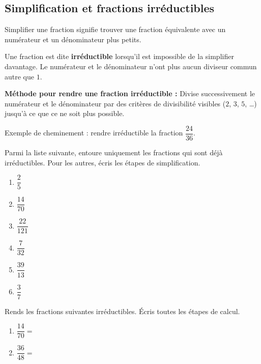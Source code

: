 \documentclass[../../syllabus_1.tex]{subfiles}
\begin{document}
\begin{itemize}
\subsection{Simplification et fractions irréductibles}
 
Simplifier une fraction signifie trouver une fraction équivalente avec un numérateur et un dénominateur plus petits.
 
Une fraction est dite \textbf{irréductible} lorsqu'il est impossible de la simplifier davantage. Le numérateur et le dénominateur n'ont plus aucun diviseur commun autre que $1$.
 
\textbf{Méthode pour rendre une fraction irréductible :}
    Divise successivement le numérateur et le dénominateur par des critères de divisibilité visibles ($2$, $3$, $5$, \dots) jusqu'à ce que ce ne soit plus possible.
 
Exemple de cheminement : rendre irréductible la fraction $\dfrac{24}{36}$.
\begin{center}
\end{center}
 
\newpage
\begin{exercise}
    Parmi la liste suivante, entoure uniquement les fractions qui sont déjà irréductibles. Pour les autres, écris les étapes de simplification.
    \begin{enumerate}[cols=3, itemsep=1.5cm, label=\ ]
        \item $\dfrac{2}{5}$
        \item $\dfrac{14}{70}$
        \item $\dfrac{22}{121}$
        \item $\dfrac{7}{32}$
        \item $\dfrac{39}{13}$
        \item $\dfrac{3}{7}$
    \end{enumerate}
    \vspace{1cm}
\end{exercise}
 
\begin{exercise}
    Rends les fractions suivantes irréductibles. Écris toutes les étapes de calcul.
    \begin{enumerate}[cols=2, itemsep=3cm]
        \item $\dfrac{14}{70} = $
        \item $\dfrac{36}{48} = $
    \end{enumerate}
\end{exercise}
 

\end{itemize}
\end{document}
